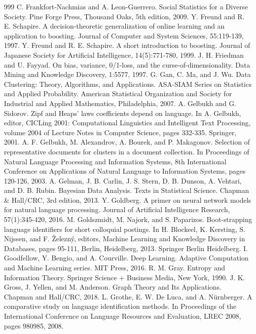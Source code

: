 \documentclass[11pt,openany,executivepaper]{book}
\begin{document}
\begin{thebibliography}{999}
 C. Frankfort-Nachmias and A. Leon-Guerrero. Social Statistics for a Diverse Society. Pine Forge Press, Thousand Oaks, 5th edition, 2009.
 Y. Freund and R. E. Schapire. A decision-theoretic generalization of online learning and an application to boosting. Journal of Computer and System Sciences, 55:119-139, 1997.
 Y. Freund and R. E. Schapire. A short introduction to boosting. Journal of Japanese Society for Artificial Intelligence, 14(5):771-780, 1999.
 J. H. Friedman and U. Fayyad. On bias, variance, 0/1-loss, and the curse-of-dimensionality. Data Mining and Knowledge Discovery, 1:5577, 1997.
 G. Gan, C. Ma, and J. Wu. Data Clustering: Theory, Algorithms, and Applications. ASA-SIAM Series on Statistics and Applied Probability. American Statistical Organization and Society for Industrial and Applied Mathematics, Philadelphia, 2007.
 A. Gelbukh and G. Sidorov. Zipf and Heaps' laws coefficients depend on language. In A. Gelbukh, editor, CICLing 2001: Computational Linguistics and Intelligent Text Processing, volume 2004 of Lecture Notes in Computer Science, pages 332-335. Springer, 2001.
 A. F. Gelbukh, M. Alexandrov, A. Bourek, and P. Makagonov. Selection of representative documents for clusters in a document collection. In Proceedings of Natural Language Processing and Information Systems, 8th International Conference on Applications of Natural Language to Information Systems, pages 120-126, 2003.
 A. Gelman, J. B. Carlin, J. S. Stern, D. B. Dunson, A. Vehtari, and D. B. Rubin. Bayesian Data Analysis. Texts in Statistical Science. Chapman \& Hall/CRC, 3rd edition, 2013.
 Y. Goldberg. A primer on neural network models for natural language processing. Journal of Artificial Intelligence Research, 57(1):345-420, 2016.
 M. Goldszmidt, M. Najork, and S. Paparizos. Boot-strapping language identifiers for short colloquial postings. In H. Blockeel, K. Kersting, S. Nijssen, and F. Železný, editors, Machine Learning and Knowledge Discovery in Databases, pages 95-111, Berlin, Heidelberg, 2013. Springer Berlin Heidelberg.
 I. Goodfellow, Y. Bengio, and A. Courville. Deep Learning. Adaptive Computation and Machine Learning series. MIT Press, 2016.
 R. M. Gray. Entropy and Information Theory. Springer Science + Business Media, New York, 1990.
 J. K. Gross, J. Yellen, and M. Anderson. Graph Theory and Its Applications. Chapman and Hall/CRC, 2018.
 L. Grothe, E. W. De Luca, and A. Nürnberger. A comparative study on language identification methods. In Proceedings of the International Conference on Language Resources and Evaluation, LREC 2008, pages 980985, 2008.

\end{thebibliography}
\end{document}
